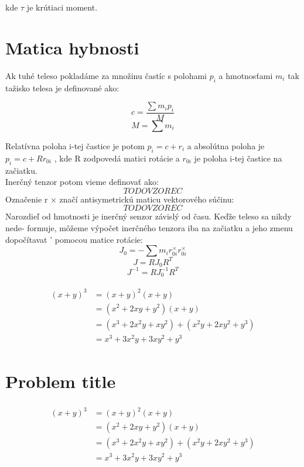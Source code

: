 \documentclass[paper=a4, fontsize=11pt]{scrartcl} %
\numberwithin{equation}{section} %
\numberwithin{figure}{section} %
\numberwithin{table}{section} %
\begin{document}
kde $\tau$ je krútiaci moment.

\section{Matica hybnosti}
Ak tuhé teleso pokladáme za množinu častíc s polohami $p_i$ a hmotnosťami $m_i$ tak tažisko
telesa je definované ako:

$$ c = \frac{\sum m_i p_i}{M} $$
$$ M = \sum m_i $$

Relatívna poloha i-tej častice je potom $p_i = c + r_i$ a absolútna poloha je $p_i = c + Rr_{0i}$ ,
kde R zodpovedá matici rotácie a $r_{0i}$ je poloha i-tej častice na začiatku. \\
Inerčný tenzor potom vieme definovať ako:
$$TODO VZOREC$$
Označenie r × značí antisymetrickú maticu vektorového súčinu:
$$TODO VZOREC$$
Narozdieľ od hmotnosti je inerčný senzor závislý od času. Keďže teleso sa nikdy nede-
formuje, môžeme výpočet inerčného tenzora iba na začiatku a jeho zmenu dopočítavat ’
pomocou matice rotácie:
$$J_0 = - \sum m_i r_{0i}^{\times} r_{0i}^{\times} $$
$$ J = RJ_{0}R^{T} $$
$$ J^{-1} = RJ_{0}^{-1}R^{T}$$



\begin{align} 
\begin{split}
(x+y)^3 	&= (x+y)^2(x+y)\\
&=(x^2+2xy+y^2)(x+y)\\
&=(x^3+2x^2y+xy^2) + (x^2y+2xy^2+y^3)\\
&=x^3+3x^2y+3xy^2+y^3
\end{split}					
\end{align}






\section{Problem title}

\lipsum[2] %

\begin{align} 
\begin{split}
(x+y)^3 	&= (x+y)^2(x+y)\\
&=(x^2+2xy+y^2)(x+y)\\
&=(x^3+2x^2y+xy^2) + (x^2y+2xy^2+y^3)\\
&=x^3+3x^2y+3xy^2+y^3
\end{split}					
\end{align}
\end{document}
